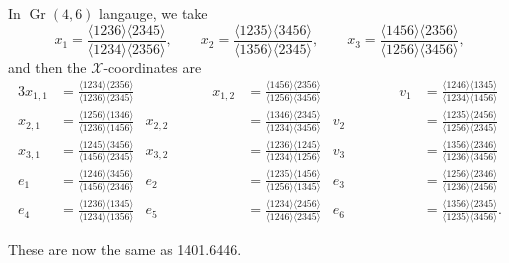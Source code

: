 \documentclass[12pt]{article}
\DeclareMathOperator{\Gr}{Gr}
\def\ket#1{\langle #1 \rangle}
\def\x{\mathcal{X}}
\begin{document}
In $\Gr(4,6)$ langauge, we take 
\begin{equation}
	x_1 = \frac{\ket{1236}\ket{2345}}{\ket{1234}\ket{2356}}, \qquad x_2 = \frac{\ket{1235}\ket{3456}}{\ket{1356}\ket{2345}}, \qquad x_3 = \frac{\ket{1456}\ket{2356}}{\ket{1256}\ket{3456}},
\end{equation}
and then the $\x$-coordinates are
\begin{alignat}{3}\label{eq:G46coords}
	x_{1,1} &= \frac{\ket{1234}\ket{2356}}{\ket{1236}\ket{2345}} &\hspace{2cm}
	x_{1,2} &= \frac{\ket{1456}\ket{2356}}{\ket{1256}\ket{3456}} &\hspace{2cm}
	v_1 &= \frac{\ket{1246}\ket{1345}}{\ket{1234}\ket{1456}} \nonumber \\ 
	x_{2,1} &= \frac{\ket{1256}\ket{1346}}{\ket{1236}\ket{1456}} &
	x_{2,2} &= \frac{\ket{1346}\ket{2345}}{\ket{1234}\ket{3456}} &
	v_2 &= \frac{\ket{1235}\ket{2456}}{\ket{1256}\ket{2345}} \nonumber \\ 
	x_{3,1} &= \frac{\ket{1245}\ket{3456}}{\ket{1456}\ket{2345}}  &
	x_{3,2} &= \frac{\ket{1236}\ket{1245}}{\ket{1234}\ket{1256}} &
	v_3 &= \frac{\ket{1356}\ket{2346}}{\ket{1236}\ket{3456}} \\ 
	e_1 &= \frac{\ket{1246}\ket{3456}}{\ket{1456}\ket{2346}} &
	e_2 &= \frac{\ket{1235}\ket{1456}}{\ket{1256}\ket{1345}} &
	e_3 &= \frac{\ket{1256}\ket{2346}}{\ket{1236}\ket{2456}} \nonumber \\
	e_4 &= \frac{\ket{1236}\ket{1345}}{\ket{1234}\ket{1356}} &
	e_5 &= \frac{\ket{1234}\ket{2456}}{\ket{1246}\ket{2345}} &
	e_6 &= \frac{\ket{1356}\ket{2345}}{\ket{1235}\ket{3456}}.\nonumber
\end{alignat}

These are now the same as 1401.6446.

\end{document}

